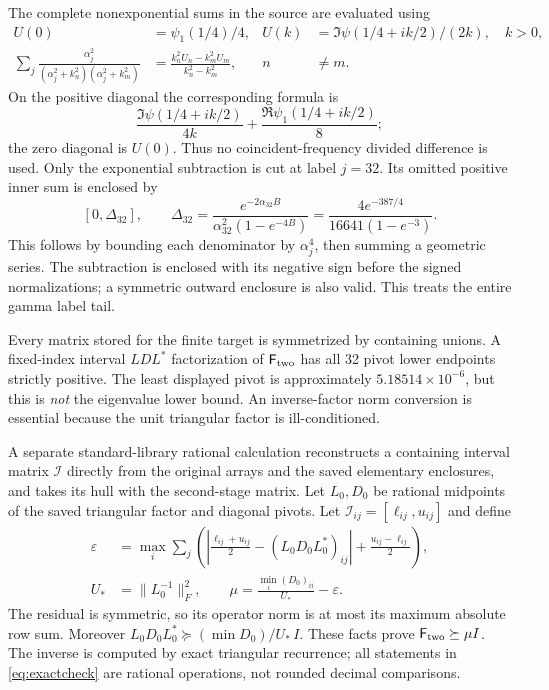 \documentclass[11pt]{article}
\newcommand{\norm}[1]{\lVert#1\rVert}
\begin{document}
The complete nonexponential sums in the source are evaluated using
\begin{align}
 U(0)&=\psi_1(1/4)/4,&
 U(k)&=\Im\psi(1/4+ik/2)/(2k),\quad k>0,\nonumber\\
 \sum_j\frac{\alpha_j^2}{(\alpha_j^2+k_n^2)(\alpha_j^2+k_m^2)}
 &=\frac{k_n^2U_n-k_m^2U_m}{k_n^2-k_m^2},& n&\ne m.\nonumber
\end{align}
On the positive diagonal the corresponding formula is
\[
 \frac{\Im\psi(1/4+ik/2)}{4k}
 +\frac{\Re\psi_1(1/4+ik/2)}8;
\]
the zero diagonal is $U(0)$. Thus no coincident-frequency divided difference is used. Only the exponential subtraction is cut at label $j=32$. Its omitted positive inner sum is enclosed by
\[
 [0,\Delta_{32}],\qquad
 \Delta_{32}=\frac{e^{-2\alpha_{32}B}}{\alpha_{32}^2(1-e^{-4B})}
 =\frac{4e^{-387/4}}{16641(1-e^{-3})}.
\]
This follows by bounding each denominator by $\alpha_j^4$, then summing a geometric series. The subtraction is enclosed with its negative sign before the signed normalizations; a symmetric outward enclosure is also valid. This treats the entire gamma label tail.

Every matrix stored for the finite target is symmetrized by containing unions. A fixed-index interval $LDL^*$ factorization of $\mathsf F_{\rm two}$ has all 32 pivot lower endpoints strictly positive. The least displayed pivot is approximately $5.18514\times10^{-6}$, but this is \emph{not} the eigenvalue lower bound. An inverse-factor norm conversion is essential because the unit triangular factor is ill-conditioned.

A separate standard-library rational calculation reconstructs a containing interval matrix $\mathcal I$ directly from the original arrays and the saved elementary enclosures, and takes its hull with the second-stage matrix. Let $L_0,D_0$ be rational midpoints of the saved triangular factor and diagonal pivots. Let $\mathcal I_{ij}=[\ell_{ij},u_{ij}]$ and define
\begin{align}
 \varepsilon&=\max_i\sum_j\left(
 \left|\frac{\ell_{ij}+u_{ij}}2-(L_0D_0L_0^*)_{ij}\right|
 +\frac{u_{ij}-\ell_{ij}}2\right),\nonumber\\
 U_*&=\norm{L_0^{-1}}_F^2,\qquad
 \mu=\frac{\min_i(D_0)_{ii}}{U_*}-\varepsilon.\label{eq:exactcheck}
\end{align}
The residual is symmetric, so its operator norm is at most its maximum absolute row sum. Moreover $L_0D_0L_0^*\succeq(\min D_0)/U_*\,I$. These facts prove $\mathsf F_{\rm two}\succeq\mu I$. The inverse is computed by exact triangular recurrence; all statements in \eqref{eq:exactcheck} are rational operations, not rounded decimal comparisons.
\end{document}
